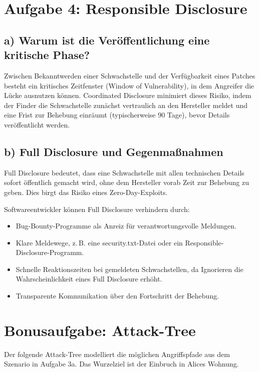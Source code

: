 \documentclass[
	fontsize=12pt,          %
	paper=a4,               %
	numbers=noenddot,       %
	listof=totoc,           %
	listof=entryprefix,     %
	listof=nochaptergap,    %
	bibliography=totoc,     %
	parskip=half,           %
	openany                 %
]{scrbook}
\begin{document}
\chapter*{Aufgabe 4: Responsible Disclosure}

\section*{a) Warum ist die Veröffentlichung eine kritische Phase?}
Zwischen Bekanntwerden einer Schwachstelle und der Verfügbarkeit eines Patches besteht ein kritisches Zeitfenster (Window of Vulnerability), in dem Angreifer die Lücke ausnutzen können.
Coordinated Disclosure minimiert dieses Risiko, indem der Finder die Schwachstelle zunächst vertraulich an den Hersteller meldet und eine Frist zur Behebung einräumt (typischerweise 90 Tage), bevor Details veröffentlicht werden.

\section*{b) Full Disclosure und Gegenmaßnahmen}
Full Disclosure bedeutet, dass eine Schwachstelle mit allen technischen Details sofort öffentlich gemacht wird, ohne dem Hersteller vorab Zeit zur Behebung zu geben.
Dies birgt das Risiko eines Zero-Day-Exploits.

Softwareentwickler können Full Disclosure verhindern durch:
\begin{itemize}
	\item Bug-Bounty-Programme als Anreiz für verantwortungsvolle Meldungen.
	\item Klare Meldewege, z.\,B. eine security.txt-Datei oder ein Responsible-Disclosure-Programm.
	\item Schnelle Reaktionszeiten bei gemeldeten Schwachstellen, da Ignorieren die Wahrscheinlichkeit eines Full Disclosure erhöht.
	\item Transparente Kommunikation über den Fortschritt der Behebung.
\end{itemize}


\chapter*{Bonusaufgabe: Attack-Tree}

Der folgende Attack-Tree modelliert die möglichen Angriffspfade aus dem Szenario in Aufgabe 3a.
Das Wurzelziel ist der Einbruch in Alices Wohnung.
\end{document}
